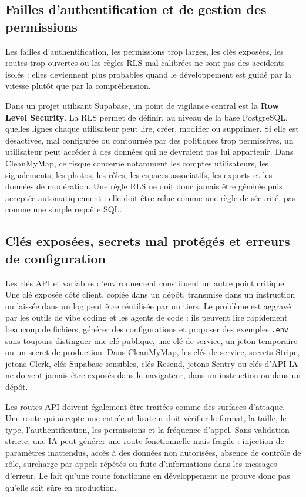\documentclass[
  10pt,
  a4paper,
  DIV=11,
  numbers=noendperiod,
  oneside]{scrreprt}
\let\oldtextbf\textbf
\renewcommand{\textbf}[1]{\oldtextbf{\textcolor{cmmnavy}{#1}}}
\begin{document}
\subsection{Failles d'authentification et de gestion des
permissions}\label{failles-dauthentification-et-de-gestion-des-permissions}

Les failles d'authentification, les permissions trop larges, les clés
exposées, les routes trop ouvertes ou les règles RLS mal calibrées ne
sont pas des accidents isolés : elles deviennent plus probables quand le
développement est guidé par la vitesse plutôt que par la compréhension.

Dans un projet utilisant Supabase, un point de vigilance central est la
\textbf{Row Level Security}. La RLS permet de définir, au niveau de la
base PostgreSQL, quelles lignes chaque utilisateur peut lire, créer,
modifier ou supprimer. Si elle est désactivée, mal configurée ou
contournée par des politiques trop permissives, un utilisateur peut
accéder à des données qui ne devraient pas lui appartenir. Dans
CleanMyMap, ce risque concerne notamment les comptes utilisateurs, les
signalements, les photos, les rôles, les espaces associatifs, les
exports et les données de modération. Une règle RLS ne doit donc jamais
être générée puis acceptée automatiquement : elle doit être relue comme
une règle de sécurité, pas comme une simple requête SQL.

\subsection{Clés exposées, secrets mal protégés et erreurs de
configuration}\label{cluxe9s-exposuxe9es-secrets-mal-protuxe9guxe9s-et-erreurs-de-configuration}

Les clés API et variables d'environnement constituent un autre point
critique. Une clé exposée côté client, copiée dans un dépôt, transmise
dans un instruction ou laissée dans un log peut être réutilisée par un
tiers. Le problème est aggravé par les outils de vibe coding et les
agents de code : ils peuvent lire rapidement beaucoup de fichiers,
générer des configurations et proposer des exemples \texttt{.env} sans
toujours distinguer une clé publique, une clé de service, un jeton
temporaire ou un secret de production. Dans CleanMyMap, les clés de
service, secrets Stripe, jetons Clerk, clés Supabase sensibles, clés
Resend, jetons Sentry ou clés d'API IA ne doivent jamais être exposés
dans le navigateur, dans un instruction ou dans un dépôt.

Les routes API doivent également être traitées comme des surfaces
d'attaque. Une route qui accepte une entrée utilisateur doit vérifier le
format, la taille, le type, l'authentification, les permissions et la
fréquence d'appel. Sans validation stricte, une IA peut générer une
route fonctionnelle mais fragile : injection de paramètres inattendus,
accès à des données non autorisées, absence de contrôle de rôle,
surcharge par appels répétés ou fuite d'informations dans les messages
d'erreur. Le fait qu'une route fonctionne en développement ne prouve
donc pas qu'elle soit sûre en production.
\end{document}
